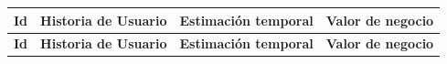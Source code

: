 	\begin{longtable}{p{2cm} p{6cm} p{4cm} p{3cm}}
	  	\hline
  	    \multicolumn{1}{p{2cm}}{\cellcolor{black!30}\textbf{Id}} &
	    \multicolumn{1}{p{6cm}}{\cellcolor{black!30}\textbf{Historia de Usuario}} & 
	 	\multicolumn{1}{p{4cm}}{\cellcolor{black!30}\textbf{Estimación temporal}} &
 	 	\multicolumn{1}{p{3cm}}{\cellcolor{black!30}\textbf{Valor de negocio}}
	 	\\
	 	\toprule 
	   	\endfirsthead
	     
	    \hline
  	    \multicolumn{1}{p{2cm}}{\cellcolor{black!30}\textbf{Id}} &
	    \multicolumn{1}{p{6cm}}{\cellcolor{black!30}\textbf{Historia de Usuario}} & 
	 	\multicolumn{1}{p{4cm}}{\cellcolor{black!30}\textbf{Estimación temporal}} &
 	 	\multicolumn{1}{p{3cm}}{\cellcolor{black!30}\textbf{Valor de negocio}}
	 	\\	 
	 	\toprule
	 	\endhead	


\end{longtable}

